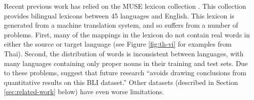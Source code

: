 \documentclass[11pt]{article}
\begin{document}
Recent previous work has relied on the MUSE lexicon collection \citep{conneau2017word}.
This collection provides bilingual lexicons between 45 languages and English.
This lexicon is generated from a machine translation system,
and so suffers from a number of problems.
First, many of the mappings in the lexicon do not contain real words in either the source or target language
(see Figure \ref{fig:th-vi} for examples from Thai).
Second, the distribution of words is inconsistent between languages,
with many languages containing only proper nouns in their training and test sets.
Due to these problems, \citet{kementchedjhieva2019lost} suggest that future research ``avoids drawing conclusions from quantitative results on this BLI dataset.''
Other datasets (described in Section \ref{sec:related-work} below) have even worse limitations.
\end{document}
